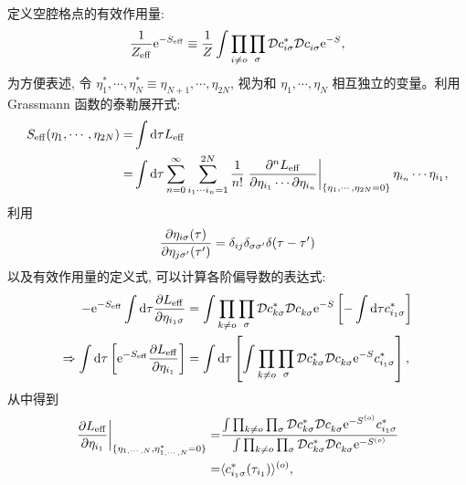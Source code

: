 定义空腔格点的有效作用量:
\begin{equation}
    \frac{1}{Z_{\mathrm{eff}}}\mathrm{e}^{-S_{\mathrm{eff}}}\equiv \frac{1}{Z}\int\prod_{i\ne o}\prod_{\sigma}\mathcal{D}c_{i\sigma}^*\mathcal{D}c_{i\sigma}^{ }\mathrm{e}^{-S},
\end{equation}
为方便表述, 令 $\eta_1^*,\cdots,\eta_{N}^*\equiv \eta_{N+1},\cdots,\eta_{2N}$, 视为和 $\eta_1,\cdots,\eta_{N}$ 相互独立的变量。利用 Grassmann 函数的泰勒展开式:
\begin{equation}
    \begin{aligned}
        S_{\mathrm{eff}}(\eta_{1},\cdots,\eta_{2N})=&\int\mathrm{d}\tau L_{\mathrm{eff}}\\
        =&\int\mathrm{d}\tau\sum_{n=0}^\infty\sum_{i_1\cdots i_n=1}^{2N}\frac{1}{n!}\left.\frac{\partial^n L_{\mathrm{eff}}}{\partial\eta_{i_1}\cdots\partial \eta_{i_n}}\right|_{\{\eta_1,\cdots,\eta_{2N}=0\}}\eta_{i_n}\cdots\eta_{i_1},
    \end{aligned}
\end{equation}
利用 
\begin{equation}
    \frac{\partial \eta_{i\sigma}(\tau)}{\partial \eta_{j\sigma'}(\tau')}=\delta_{ij}\delta_{\sigma\sigma'}\delta(\tau-\tau')
\end{equation}
以及有效作用量的定义式, 可以计算各阶偏导数的表达式:
\begin{equation}
    \begin{aligned}
        -\mathrm{e}^{-S_{\mathrm{eff}}}\int\mathrm{d}\tau\frac{\partial L_{\mathrm{eff}}}{\partial \eta_{i_1\sigma}}&=\int\prod_{k\ne o}\prod_\sigma\mathcal{D}c_{k\sigma}^*\mathcal{D}c_{k\sigma}^{ }\mathrm{e}^{-S}\left[ -\int\mathrm{d}\tau c_{i_1\sigma}^*\right]\\
        \Rightarrow \int\mathrm{d}\tau\left[ \mathrm{e}^{-S_{\mathrm{eff}}}\frac{\partial L_{\mathrm{eff}}}{\partial \eta_{i_1}} \right] &=\int\mathrm{d}\tau\left[ \int\prod_{k\ne o}\prod_\sigma\mathcal{D}c_{k\sigma}^*\mathcal{D}c_{k\sigma}^{ }\mathrm{e}^{-S} c_{i_1\sigma}^* \right],
    \end{aligned}
\end{equation}
从中得到 
\begin{equation}
    \begin{aligned}
        \left.\frac{\partial L_{\mathrm{eff}}}{\partial \eta_{i_1}}\right|_{\{\eta_{1,\cdots,N},\eta_{1,\cdots,N}^*=0\}}=&\frac{\int\prod_{k\ne o}\prod_{\sigma}\mathcal{D}c_{k\sigma}^*\mathcal{D} c_{k\sigma}^{ }\mathrm{e}^{-S^{(o)}}c_{i_1\sigma}^*}{\int\prod_{k\ne o}\prod_{\sigma}\mathcal{D}c_{k\sigma}^*\mathcal{D} c_{k\sigma}^{ }\mathrm{e}^{-S^{(o)}}}\\
        =&\langle c^*_{i_1\sigma}(\tau_{i_1}) \rangle^{(o)},
    \end{aligned}
\end{equation}
